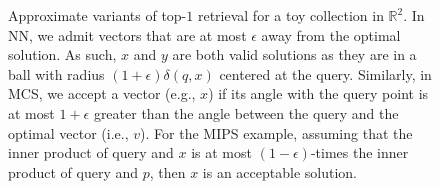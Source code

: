 \begin{figure}[t]
    \centering
    \caption{Approximate variants of top-$1$ retrieval for a toy collection in $\mathbb{R}^2$.
    In NN, we admit vectors that are at most $\epsilon$ away from the optimal solution. As such,
    $x$ and $y$ are both valid solutions as they are in a ball with radius $(1+\epsilon) \delta(q, x)$
    centered at the query.
    Similarly, in MCS, we accept a vector (e.g., $x$) if its angle with the query point is at most $1 + \epsilon$
    greater than the angle between the query and the optimal vector (i.e., $v$).
    For the MIPS example, assuming that the inner product of query and $x$ is at most
    $(1 - \epsilon)$-times the inner product of query and $p$, then $x$ is an acceptable solution.}
    \label{figure:flavors:flavors-approximate}
\end{figure}

